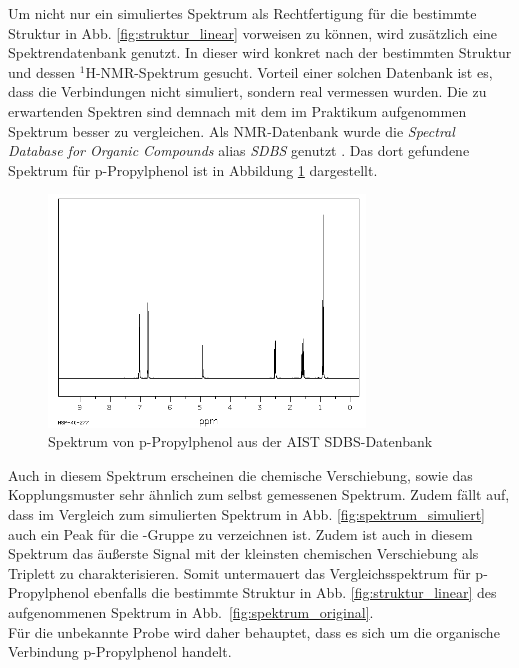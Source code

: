 Um nicht nur ein simuliertes Spektrum als Rechtfertigung für die bestimmte Struktur in Abb. \ref{fig:struktur_linear} vorweisen zu können, wird zusätzlich eine Spektrendatenbank genutzt. In dieser wird konkret nach der bestimmten Struktur und dessen ${}^1$H-NMR-Spektrum gesucht. Vorteil einer solchen Datenbank ist es, dass die Verbindungen nicht simuliert, sondern real vermessen wurden. Die zu erwartenden Spektren sind demnach mit dem im Praktikum aufgenommen Spektrum besser zu vergleichen. Als NMR-Datenbank wurde die \textit{Spectral Database for Organic Compounds} alias \textit{SDBS} genutzt \cite{AIST.30.06.2021}. Das dort gefundene Spektrum für p-Propylphenol ist in Abbildung \ref{fig:spektrum_sdbs} dargestellt.

\begin{figure}[h!]
	\centering
	\includegraphics[width=0.75\textwidth]{img/sdbs_spektrum.png}
	\caption{Spektrum von p-Propylphenol aus der \textsc{AIST} SDBS-Datenbank \cite{AIST.30.06.2021}}
	\label{fig:spektrum_sdbs}
\end{figure}
\FloatBarrier

Auch in diesem Spektrum erscheinen die chemische Verschiebung, sowie das Kopplungsmuster sehr ähnlich zum selbst gemessenen Spektrum. Zudem fällt auf, dass im Vergleich zum simulierten Spektrum in Abb. \ref{fig:spektrum_simuliert} auch ein Peak für die  -Gruppe zu verzeichnen ist. Zudem ist auch in diesem Spektrum das äußerste Signal mit der kleinsten chemischen Verschiebung als Triplett zu charakterisieren.
Somit untermauert das Vergleichsspektrum für p-Propylphenol ebenfalls die bestimmte Struktur in Abb. \ref{fig:struktur_linear} des aufgenommenen Spektrum in \mbox{Abb. \ref{fig:spektrum_original}}. \\

Für die unbekannte Probe wird daher behauptet, dass es sich um die organische Verbindung p-Propylphenol handelt.